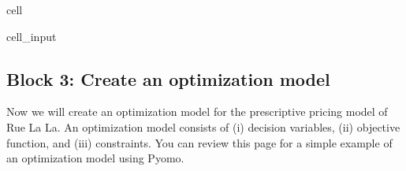 \documentclass[letterpaper,10pt,english]{jupyterBook}
\begin{document}
\begin{sphinxuseclass}{cell}\begin{sphinxVerbatimInput}

\begin{sphinxuseclass}{cell_input}
\begin{sphinxVerbatim}[commandchars=\\\{\}]
   

  \PYG{p}{[}   \PYG{p}{]}
  \PYG{p}{[}  \PYG{p}{]}
  

  
  
\end{sphinxVerbatim}

\end{sphinxuseclass}\end{sphinxVerbatimInput}

\end{sphinxuseclass}

\subsection{Block 3: Create an optimization model}
\label{\detokenize{docs/Case1_4_Module2A_Retail_Price_Optimization:block-3-create-an-optimization-model}}
\sphinxAtStartPar
Now we will create an optimization model for the prescriptive pricing model of Rue La La. An optimization model consists of (i) decision variables, (ii) objective function, and (iii) constraints. You can review this page  for a simple example of an optimization model using Pyomo.
\end{document}
